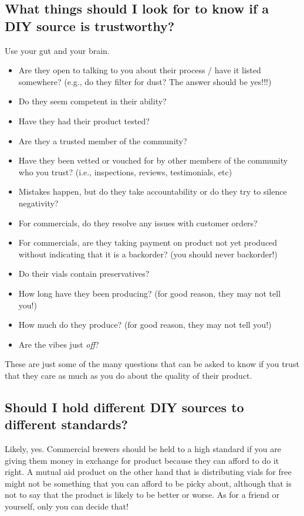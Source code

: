 \documentclass{article}
\begin{document}
\subsection{What things should I look for to know if a DIY source is trustworthy?}

Use your gut and your brain.

\begin{itemize}
  \item Are they open to talking to you about their process / have it listed somewhere? (e.g., do they filter for dust? The answer should be yes!!!)
  \item Do they seem competent in their ability?
  \item Have they had their product tested?
  \item Are they a trusted member of the community?
  \item Have they been vetted or vouched for by other members of the community who you trust? (i.e., inspections, reviews, testimonials, etc)
  \item Mistakes happen, but do they take accountability or do they try to silence negativity?
  \item For commercials, do they resolve any issues with customer orders?
  \item For commercials, are they taking payment on product not yet produced without indicating that it is a backorder? (you should never backorder!)
  \item Do their vials contain preservatives?
  \item How long have they been producing? (for good reason, they may not tell you!)
  \item How much do they produce? (for good reason, they may not tell you!)
  \item Are the vibes just \textit{off}?
\end{itemize}

These are just some of the many questions that can be asked to know if you trust that they care as much as you do about the quality of their product.

\subsection{Should I hold different DIY sources to different standards?}

Likely, yes. Commercial brewers should be held to a high standard if you are giving them money in exchange for product because they can afford to do it right. A mutual aid product on the other hand that is distributing vials for free might not be something that you can afford to be picky about, although that is not to say that the product is likely to be better or worse. As for a friend or yourself, only you can decide that!
\end{document}
